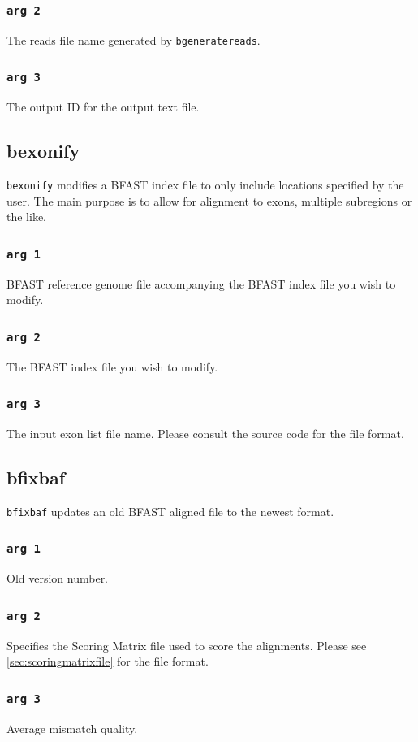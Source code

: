 \documentclass[a4paper,12pt]{book}
\newcommand{\TT}[1]{{\tt #1}} %
\newcommand{\BRGF}{BFAST reference genome file} %
\newcommand{\BIF}{BFAST index file} %
\newcommand{\BAF}{BFAST aligned file} %
\begin{document}
\subsubsection{\TT{arg 2}}
The reads file name generated by \TT{bgeneratereads}.

\subsubsection{\TT{arg 3}}
The output ID for the output text file.

\subsection{bexonify}
\label{sec:bexonify}
\TT{bexonify} modifies a \BIF{} to only include locations specified by the user.  
The main purpose is to allow for alignment to exons, multiple subregions or the like.

\subsubsection{\TT{arg 1}}
\BRGF{} accompanying the \BIF{} you wish to modify.

\subsubsection{\TT{arg 2}}
The \BIF{} you wish to modify.

\subsubsection{\TT{arg 3}}
The input exon list file name. 
Please consult the source code for the file format.
\subsection{bfixbaf}
\label{sec:bfixbaf}
\TT{bfixbaf} updates an old \BAF{} to the newest format.
\subsubsection{\TT{arg 1}}
Old version number.
\subsubsection{\TT{arg 2}}
Specifies the Scoring Matrix file used to score the alignments.
Please see \autoref{sec:scoringmatrixfile} for the file format.
\subsubsection{\TT{arg 3}}
Average mismatch quality.
\end{document}
